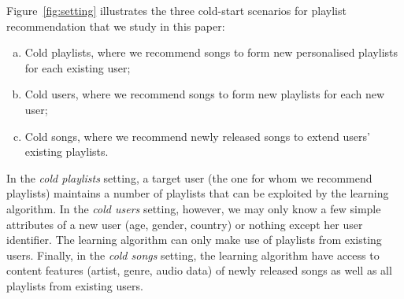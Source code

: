 Figure~\ref{fig:setting} illustrates the three cold-start scenarios for playlist recommendation 
that we study in this paper:
\begin{enumerate}[(a)]
\item Cold playlists, where we recommend songs to form new personalised playlists for each existing user;
%
\item Cold users, where we recommend songs to form new playlists for each new user;
%
\item Cold songs, where we recommend newly released songs to extend users' existing playlists.
\end{enumerate}
In the \emph{cold playlists} setting, a target user (\ie the one for whom we recommend playlists)
maintains a number of playlists that can be exploited by the learning algorithm.
In the \emph{cold users} setting, however, we may only know a few simple attributes of a new user
(\eg age, gender, country) or nothing except her user identifier. 
The learning algorithm can only make use of playlists from existing users.
Finally, in the \emph{cold songs} setting, the learning algorithm have access to 
content features (\eg artist, genre, audio data) 
of newly released songs as well as all playlists from existing users.

